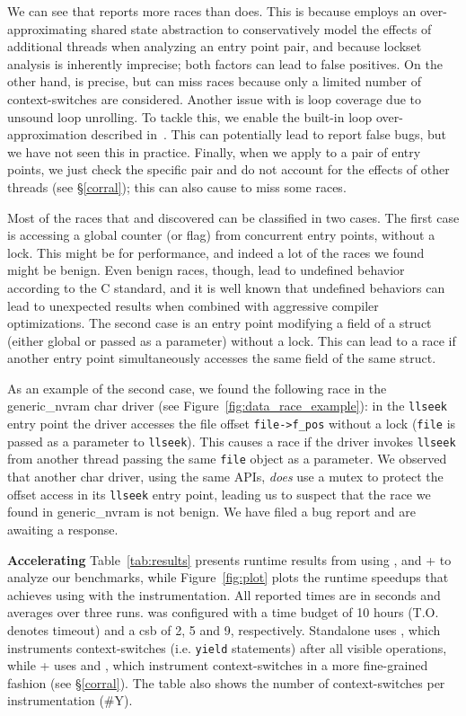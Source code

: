 We can see that \whoop reports more races than \corral does. This is because \whoop employs an over-approximating shared state abstraction to conservatively model the effects of additional threads when analyzing an entry point pair, and because lockset analysis is inherently imprecise; both factors can lead to false positives.  On the other hand, \corral is precise, but can miss races because only a limited number of context-switches are considered.  Another issue with \corral is loop coverage due to unsound loop unrolling. To tackle this, we enable the built-in loop over-approximation described in~\cite{lal2014powering}. This can potentially lead \corral to report false bugs, but we have not seen this in practice. Finally, when we apply \corral to a pair of entry points, we just check the specific pair and do not account for the effects of other threads (see \S\ref{corral}); this can also cause \corral to miss some races.

Most of the races that \whoop and \corral discovered can be classified in two cases. The first case is accessing a global counter (or flag) from concurrent entry points, without a lock. This might be for performance, and indeed a lot of the races we found might be benign. Even benign races, though, lead to undefined behavior according to the C standard, and it is well known that undefined behaviors can lead to unexpected results when combined with aggressive compiler optimizations. The second case is an entry point modifying a field of a struct (either global or passed as a parameter) without a lock. This can lead to a race if another entry point simultaneously accesses the same field of the same struct.

As an example of the second case, we found the following race in the generic\_nvram char driver (see Figure~\ref{fig:data_race_example}): in the \texttt{llseek} entry point the driver accesses the file offset \texttt{file->f\_pos} without a lock (\texttt{file} is passed as a parameter to \texttt{llseek}). This causes a race if the driver invokes \texttt{llseek} from another thread passing the same \texttt{file} object as a parameter.  We observed that another char driver, using the same APIs, \emph{does} use a mutex to protect the offset access in its \texttt{llseek} entry point, leading us to suspect that the race we found in generic\_nvram is not benign.  We have filed a bug report  and are awaiting a response.

\noindent\textbf{Accelerating \corral }
%
Table~\ref{tab:results} presents runtime results from using \whoop, \corral and \whoop + \corral to analyze our benchmarks, while Figure~\ref{fig:plot} plots the runtime speedups that \corral achieves using \whoop with the \yieldmr instrumentation. All reported times are in seconds and averages over three runs. \corral was configured with a time budget of 10 hours (T.O. denotes timeout) and a csb of 2, 5 and 9, respectively. Standalone \corral uses \yieldall, which instruments context-switches (i.e. \texttt{yield} statements) after all visible operations, while \whoop + \corral uses \yieldcoarse and \yieldmr, which instrument context-switches in a more fine-grained fashion (see \S\ref{corral}). The table also shows the number of context-switches per instrumentation (\#Y).

